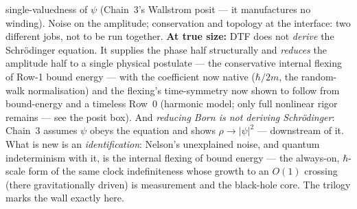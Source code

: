 \documentclass[11pt]{article}
\begin{document}
\begin{tcolorbox}[keybox]
single-valuedness of $\psi$ (Chain~3's Wallstrom posit --- it manufactures no winding). Noise on the
amplitude; conservation and topology at the interface: two different jobs, not to be run together.
\smallskip
\noindent\textbf{At true size:} DTF does not \emph{derive} the Schr\"odinger equation. It supplies the
phase half structurally and \emph{reduces} the amplitude half to a single physical postulate --- the
conservative internal flexing of Row-1 bound energy --- with the coefficient now native ($\hbar/2m$, the
random-walk normalisation) and the flexing's time-symmetry now shown to follow from bound-energy and a
timeless Row~0 (harmonic model; only full nonlinear rigor remains --- see the posit box). And \emph{reducing Born
is not deriving Schr\"odinger}: Chain~3 assumes $\psi$ obeys the equation and shows $\rho\to|\psi|^2$ ---
downstream of it. What is new is an \emph{identification}: Nelson's unexplained noise, and quantum
indeterminism with it, is the internal flexing of bound energy --- the always-on, $\hbar$-scale form of the
same clock indefiniteness whose growth to an $O(1)$ crossing (there gravitationally driven) is measurement
and the black-hole core. The trilogy marks the wall exactly here.
\end{tcolorbox}
\end{document}
